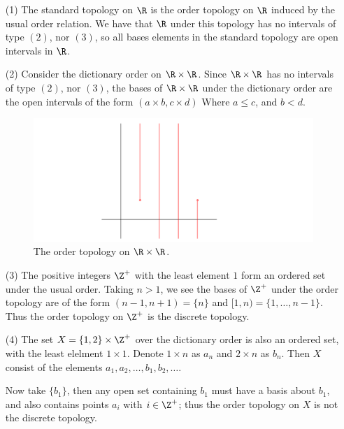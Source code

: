 \begin{example}
    \begin{enumerate}
        \item[(1)] The standard topology on $\R$ is the order topology on $\R$ induced by the
            usual order relation. We have that $\R$ under this topology has no intervals of
            type  $(2)$, nor  $(3)$, so all bases elements in the standard topology are
            open intervals in $\R$.

        \item[(2)] Consider the dictionary order on  $\R \times \R$. Since  $\R \times \R$ has
            no intervals of type $(2)$, nor $(3)$, the bases of  $\R \times \R$ under the
            dictionary order are the open intervals of the form  $(a \times b, c \times d)$ Where
             $a \leq c$, and  $b<d$.

             \begin{figure}[h]
                 \centering
                 \includegraphics[scale = 0.3]{Figures/Chapter1/orderTopologyOnRxR.png}
                 \caption{The order topology on $\R \times \R$.}
                 \label{fig1.3}
             \end{figure}

         \item[(3)] The positive integers  $\Z^+$ with the least element  $1$ form an ordered set
             under the usual order. Taking  $n>1$, we see the bases of  $\Z^+$ under the order
             topology are of the form  $(n-1,n+1)=\{n\}$ and $[1,n)=\{1, \dots ,n-1\}$. Thus
             the order topology on  $\Z^+$ is the discrete topology.


         \item[(4)] The set  $X=\{1,2\} \times \Z^+$ over the dictionary order is also an ordered set,
             with the least elelment  $1 \times 1$. Denote  $1 \times n$ as  $a_n$ and  $2 \times n$ as
              $b_n$. Then  $X$ consist of the elements  $a_1,a_2, \dots,b_1,b_2,\dots$.

              Now take $\{b_1\}$, then any open set containing $b_1$ must have a basis
              about $b_1$, and also contains points $a_i$ with  $i \in \Z^+$; thus the
              order topology on  $X$ is not the discrete topology.
    \end{enumerate}
\end{example}

